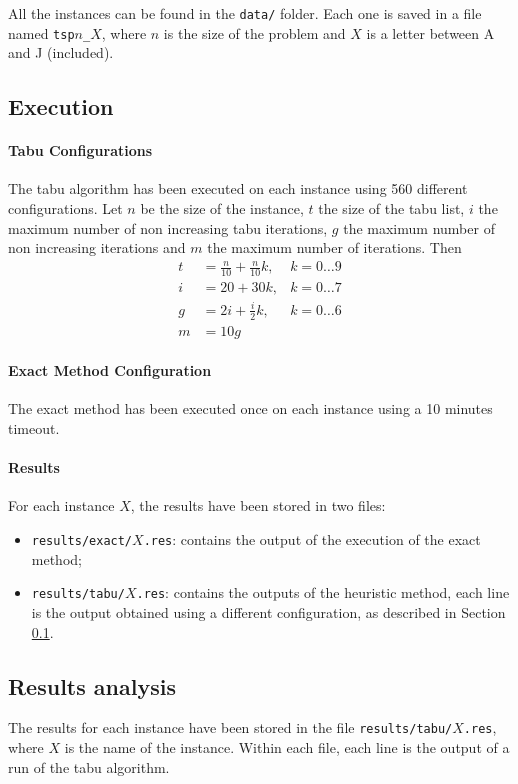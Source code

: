 \documentclass{article}
\begin{document}
All the instances can be found in the \texttt{data/} folder.
Each one is saved in a file named \texttt{tsp$n$\_$X$}, where $n$ is the size of the problem and $X$ is a letter between A and J (included).

\subsection{Execution}
\label{sec:exp:exe}

\paragraph{Tabu Configurations}
The tabu algorithm has been executed on each instance using 560 different configurations.
Let $n$ be the size of the instance, $t$ the size of the tabu list, $i$ the maximum number of non increasing tabu iterations, $g$ the maximum number of non increasing iterations and $m$ the maximum number of iterations.
Then
\begin{align*}
    t & = \frac{n}{10} + \frac{n}{10} k, & k = 0 \dots 9 \\
    i & = 20 + 30 k,                     & k = 0 \dots 7 \\
    g & = 2 i + \frac{i}{2} k,           & k = 0 \dots 6 \\
    m & = 10 g
\end{align*}

\paragraph{Exact Method Configuration}
The exact method has been executed once on each instance using a 10 minutes timeout.

\paragraph{Results}
For each instance $X$, the results have been stored in two files:
\begin{itemize}
    \item \texttt{results/exact/$X$.res}: contains the output of the execution of the exact method;
    \item \texttt{results/tabu/$X$.res}: contains the outputs of the heuristic method, each line is the output obtained using a different configuration, as described in Section \ref{sec:exp:exe}.
\end{itemize}

\subsection{Results analysis}
\label{sec:exp:res}
The results for each instance have been stored in the file \texttt{results/tabu/$X$.res}, where $X$ is the name of the instance.
Within each file, each line is the output of a run of the tabu algorithm.
\end{document}

